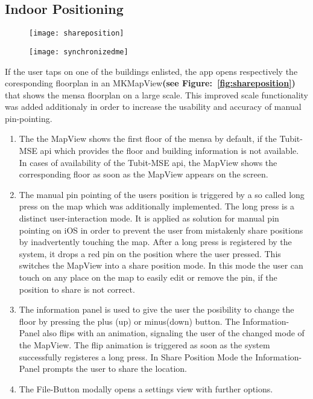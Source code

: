 \subsection{Indoor Positioning}

\begin{figure}
\centering
\begin{minipage}{.5\textwidth}
  \centering
  \texttt{[image: shareposition]}
  \label{fig:shareposition}
\end{minipage}%
\begin{minipage}{.5\textwidth}
  \centering
  \texttt{[image: synchronizedme]}
  \label{fig:synchronizedme}
\end{minipage}
\end{figure}


If the user taps on one of the buildings enlisted, the app opens respectively
the coresponding floorplan in an MKMapView\textbf{(see Figure:~\ref{fig:shareposition})} that shows the mensa floorplan on a large scale. This improved scale functionality was added additionaly in order to increase the usability and accuracy of manual pin-pointing.

\begin{enumerate}
\item The the MapView shows the first floor of the mensa by default, if the Tubit-MSE api which provides the floor and building information is not available. In cases of availability of the Tubit-MSE api, the MapView shows the corresponding floor as soon as the MapView appears on the screen.

\item The manual pin pointing of the users position is triggered by a so called long press on the map which was additionally implemented. The long press is a distinct user-interaction mode. It is applied as solution for manual pin pointing on iOS in order to prevent the user from mistakenly share  positions by inadvertently touching the map. After a long press is registered by the system, it drops a red pin on the position where the user pressed. This switches the MapView into a share position mode. In this mode the user can touch on any place on the map to easily edit or remove the pin, if the position to share is not correct.

\item The information panel is used to give the user the posibility to change the floor by pressing the plus (up) or minus(down) button. The Information-Panel also flips with an animation, signaling the user of the changed mode of the MapView. The flip animation is triggered as soon as the system successfully registeres a long press. In Share Position Mode the Information-Panel prompts the user to share the location.

\item The File-Button modally opens a settings view with further options.
\end{enumerate}


